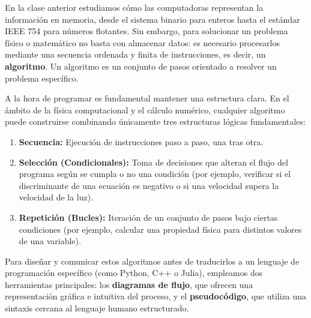 \documentclass[12pt]{article}
\begin{document}
En la clase anterior estudiamos cómo las computadoras 
representan la información en memoria, desde el sistema 
binario para enteros hasta el estándar IEEE 754 para números flotantes. 
Sin embargo, para solucionar un problema físico o matemático no basta con 
almacenar datos: es necesario procesarlos mediante una secuencia ordenada y 
finita de instrucciones, es decir, un \textbf{algoritmo}. Un algoritmo es 
un conjunto de pasos orientado a resolver un problema específico.

\noindent A la hora de programar es fundamental mantener 
una estructura clara. En el ámbito de la física computacional 
y el cálculo numérico, cualquier algoritmo puede construirse combinando 
únicamente tres estructuras lógicas fundamentales:

\begin{enumerate}[label=\textbf{\arabic*.}]
    \item \textbf{Secuencia:} Ejecución de instrucciones paso a paso, una tras otra.
    \item \textbf{Selección (Condicionales):} Toma de decisiones que alteran el flujo 
    del programa según se cumpla o no una condición (por ejemplo, verificar si el discriminante 
    de una ecuación es negativo o si una velocidad supera la velocidad de la luz).
    \item \textbf{Repetición (Bucles):} Iteración de un conjunto de pasos bajo ciertas 
    condiciones (por ejemplo, calcular una propiedad física para distintos valores de una variable).
\end{enumerate}

Para diseñar y comunicar estos algoritmos antes de traducirlos a un lenguaje de programación 
específico (como Python, C++ o Julia), empleamos dos herramientas principales: 
los \textbf{diagramas de flujo}, que ofrecen una representación gráfica e intuitiva del proceso, 
y el \textbf{pseudocódigo}, que utiliza una sintaxis cercana al lenguaje humano estructurado. 
\end{document}
